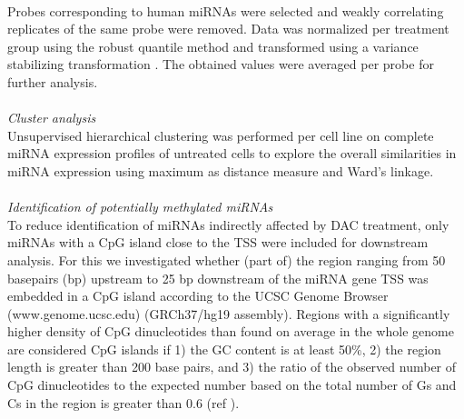 \\ 
Probes corresponding to human miRNAs were selected and weakly correlating replicates of the same probe were removed. Data was normalized per treatment group using the robust quantile method and transformed using a variance stabilizing transformation \cite{Boldstad2003, Huber2002}. The obtained values were averaged per probe for further analysis.
\\
\\
\textit{Cluster analysis}
\\
Unsupervised hierarchical clustering was performed per cell line on complete miRNA expression profiles of untreated cells to explore the overall similarities in miRNA expression using maximum as distance measure and Ward’s linkage. 
\\
\\
\textit{Identification of potentially methylated miRNAs}
\\
To reduce identification of miRNAs indirectly affected by DAC treatment, only miRNAs with a CpG island close to the TSS were included for downstream analysis. For this we investigated whether (part of) the region ranging from 50 basepairs (bp) upstream to 25 bp downstream of the miRNA gene TSS was embedded in a CpG island according to the UCSC Genome Browser (www.genome.ucsc.edu) (GRCh37/hg19 assembly). Regions with a significantly higher density of CpG dinucleotides than found on average in the whole genome are considered CpG islands if 1) the GC content is at least 50$\%$, 2) the region length is greater than 200 base pairs, and 3) the ratio of the observed number of CpG dinucleotides to the expected number based on the total number of Gs and Cs in the region is greater than 0.6 (ref \cite{Gardiner1987}).

